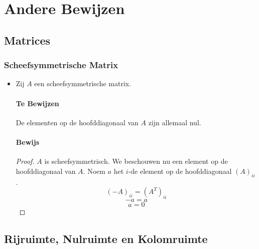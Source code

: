 \documentclass[lineaire_algebra_oplossingen.tex]{subfiles}
\begin{document}
\chapter{Andere Bewijzen}
\section{Matrices}

\subsection{Scheefsymmetrische Matrix}
\begin{itemize}
\item
Zij $A$ een scheefsymmetrische matrix.
\subsubsection*{Te Bewijzen}
De elementen op de hoofddiagonaal van $A$ zijn allemaal nul.

\subsubsection*{Bewijs}
\begin{proof}
$A$ is scheefsymmetrisch. We beschouwen nu een element op de hoofddiagonaal van $A$. Noem $a$ het $i$-de element op de hoofddiagonaal $(A)_{ii}$.
\[
(-A)_{ii} = (A^T)_{ii}
\]
\[
-a = a
\]
\[
a = 0
\]
\end{proof}
\end{itemize}

\section{Rijruimte, Nulruimte en Kolomruimte}
\end{document}
